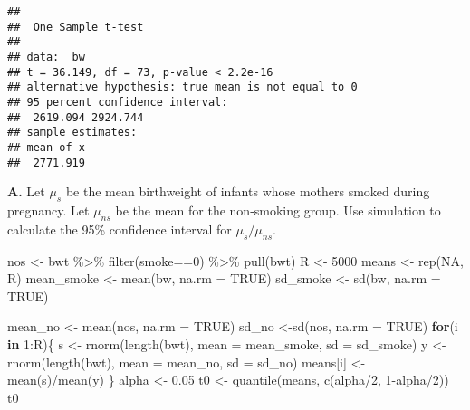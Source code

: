 \documentclass[
]{article}
\newenvironment{Shaded}{\begin{snugshade}}{\end{snugshade}}
\newcommand{\AttributeTok}[1]{\textcolor[rgb]{0.77,0.63,0.00}{#1}}
\newcommand{\ConstantTok}[1]{\textcolor[rgb]{0.00,0.00,0.00}{#1}}
\newcommand{\ControlFlowTok}[1]{\textcolor[rgb]{0.13,0.29,0.53}{\textbf{#1}}}
\newcommand{\DecValTok}[1]{\textcolor[rgb]{0.00,0.00,0.81}{#1}}
\newcommand{\FloatTok}[1]{\textcolor[rgb]{0.00,0.00,0.81}{#1}}
\newcommand{\FunctionTok}[1]{\textcolor[rgb]{0.00,0.00,0.00}{#1}}
\newcommand{\NormalTok}[1]{#1}
\newcommand{\OtherTok}[1]{\textcolor[rgb]{0.56,0.35,0.01}{#1}}
\newcommand{\SpecialCharTok}[1]{\textcolor[rgb]{0.00,0.00,0.00}{#1}}
\begin{document}
\begin{verbatim}
## 
##  One Sample t-test
## 
## data:  bw
## t = 36.149, df = 73, p-value < 2.2e-16
## alternative hypothesis: true mean is not equal to 0
## 95 percent confidence interval:
##  2619.094 2924.744
## sample estimates:
## mean of x 
##  2771.919
\end{verbatim}

\textbf{A.} Let \(\mu_s\) be the mean birthweight of infants whose
mothers smoked during pregnancy. Let \(\mu_{ns}\) be the mean for the
non-smoking group. Use simulation to calculate the 95\% confidence
interval for \(\mu_s/\mu_{ns}\).

\begin{Shaded}
\begin{Highlighting}[]
\NormalTok{nos }\OtherTok{\textless{}{-}}\NormalTok{ bwt }\SpecialCharTok{\%\textgreater{}\%} 
  \FunctionTok{filter}\NormalTok{(smoke}\SpecialCharTok{==}\DecValTok{0}\NormalTok{) }\SpecialCharTok{\%\textgreater{}\%}
  \FunctionTok{pull}\NormalTok{(bwt)}
\NormalTok{R }\OtherTok{\textless{}{-}} \DecValTok{5000}
\NormalTok{means }\OtherTok{\textless{}{-}} \FunctionTok{rep}\NormalTok{(}\ConstantTok{NA}\NormalTok{, R)}
\NormalTok{mean\_smoke }\OtherTok{\textless{}{-}} \FunctionTok{mean}\NormalTok{(bw, }\AttributeTok{na.rm =} \ConstantTok{TRUE}\NormalTok{)}
\NormalTok{sd\_smoke }\OtherTok{\textless{}{-}} \FunctionTok{sd}\NormalTok{(bw, }\AttributeTok{na.rm =} \ConstantTok{TRUE}\NormalTok{)}

\NormalTok{mean\_no }\OtherTok{\textless{}{-}} \FunctionTok{mean}\NormalTok{(nos, }\AttributeTok{na.rm =} \ConstantTok{TRUE}\NormalTok{)}
\NormalTok{sd\_no }\OtherTok{\textless{}{-}}\FunctionTok{sd}\NormalTok{(nos, }\AttributeTok{na.rm =} \ConstantTok{TRUE}\NormalTok{)}
\ControlFlowTok{for}\NormalTok{(i }\ControlFlowTok{in} \DecValTok{1}\SpecialCharTok{:}\NormalTok{R)\{}
\NormalTok{  s }\OtherTok{\textless{}{-}} \FunctionTok{rnorm}\NormalTok{(}\FunctionTok{length}\NormalTok{(bwt), }\AttributeTok{mean =}\NormalTok{ mean\_smoke, }\AttributeTok{sd =}\NormalTok{ sd\_smoke)}
\NormalTok{  y }\OtherTok{\textless{}{-}} \FunctionTok{rnorm}\NormalTok{(}\FunctionTok{length}\NormalTok{(bwt), }\AttributeTok{mean =}\NormalTok{ mean\_no, }\AttributeTok{sd =}\NormalTok{ sd\_no)}
\NormalTok{  means[i] }\OtherTok{\textless{}{-}} \FunctionTok{mean}\NormalTok{(s)}\SpecialCharTok{/}\FunctionTok{mean}\NormalTok{(y)}
\NormalTok{\}}
\NormalTok{alpha }\OtherTok{\textless{}{-}} \FloatTok{0.05}
\NormalTok{t0 }\OtherTok{\textless{}{-}} \FunctionTok{quantile}\NormalTok{(means, }\FunctionTok{c}\NormalTok{(alpha}\SpecialCharTok{/}\DecValTok{2}\NormalTok{, }\DecValTok{1}\SpecialCharTok{{-}}\NormalTok{alpha}\SpecialCharTok{/}\DecValTok{2}\NormalTok{))}
\NormalTok{t0}
\end{Highlighting}
\end{Shaded}
\end{document}
